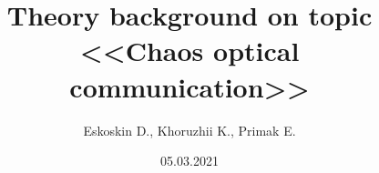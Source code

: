 \documentclass[]{beamer}
\title[Optical chaos]{Theory background on topic \\ <<Chaos optical communication>>}
\author{Eskoskin D., Khoruzhii K., Primak E.}
\institute[MIPT]
\begin{document}
\date{05.03.2021}
\maketitle

% 

% 
% 
% 








\end{document}
